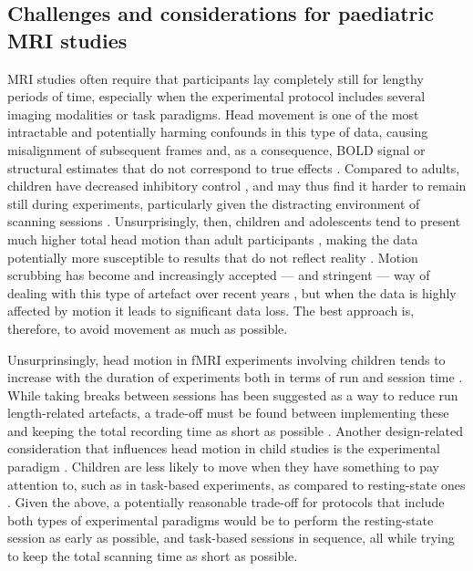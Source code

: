\subsection{Challenges and considerations for paediatric MRI studies}


MRI studies often require that participants lay completely still for lengthy periods of time, especially when the experimental protocol includes several imaging modalities or task paradigms. Head movement is one of the most intractable and potentially harming confounds in this type of data, causing misalignment of subsequent frames and, as a consequence, BOLD signal or structural estimates that do not correspond to true effects \citep{Friston1996,Siegel2017}. Compared to adults, children have decreased inhibitory control \citep{Bedard2002}, and may thus find it harder to remain still during experiments, particularly  given the distracting environment of scanning sessions \citep{Greene2016}. Unsurprisingly, then, children and adolescents tend to present much higher total head motion than adult participants \citep{Satterthwaite2013b}, making the data potentially more susceptible to results that do not reflect reality \citep{Power2012}. Motion scrubbing has become and increasingly accepted --- and stringent --- way of dealing with this type of artefact over recent years \citep{Power2014a,Laumann2016}, but when the data is highly affected by motion it leads to significant data loss. The best approach is, therefore, to avoid movement as much as possible.

Unsurprinsingly, head motion in fMRI experiments involving children tends to increase with the duration of experiments both in terms of run and session time \citep{Engelhardt2017}. While taking breaks between sessions has been suggested as a way to reduce run length-related artefacts, a trade-off must be found between implementing these and keeping the total recording time as short as possible \citep{Meissner2019}.  Another design-related consideration that influences head motion in child studies is the experimental paradigm \citep{Yuan2009a}. Children are less likely to move when they have something to pay attention to, such as in task-based experiments, as compared to resting-state ones \citep{Engelhardt2017}. Given the above, a potentially reasonable trade-off for protocols that include both types of experimental paradigms would be to perform the resting-state session as early as possible, and task-based sessions in sequence, all while trying to keep the total scanning time as short as possible. 


